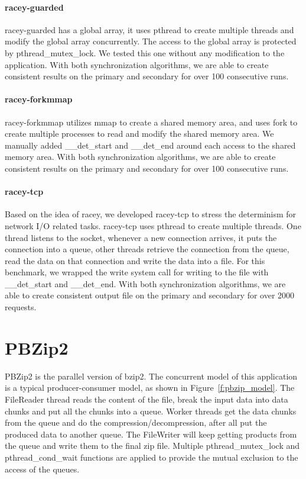 \paragraph{racey-guarded} racey-guarded has a global array, it uses pthread to create multiple threads and modify the global array concurrently. The access to the global array is protected by pthread\_mutex\_lock. We tested this one without any modification to the application. With both synchronization algorithms, we are able to create consistent results on the primary and secondary for over 100 consecutive runs.

\paragraph{racey-forkmmap} racey-forkmmap utilizes mmap to create a shared memory area, and uses fork to create multiple processes to read and modify the shared memory area. We manually added \_\_det\_start and \_\_det\_end around each access to the shared memory area. With both synchronization algorithms, we are able to create consistent results on the primary and secondary for over 100 consecutive runs.

\paragraph{racey-tcp} Based on the idea of racey, we developed racey-tcp to stress the determinism for network I/O related tasks. racey-tcp uses pthread to create multiple threads. One thread listens to the socket, whenever a new connection arrives, it puts the connection into a queue, other threads retrieve the connection from the queue, read the data on that connection and write the data into a file. For this benchmark, we wrapped the write system call for writing to the file with \_\_det\_start and \_\_det\_end. With both synchronization algorithms, we are able to create consistent output file on the primary and secondary for over 2000 requests.

\section{PBZip2}
PBZip2 is the parallel version of bzip2. The concurrent model of this application is a typical producer-consumer model, as shown in Figure~\ref{f:pbzip_model}. The FileReader thread reads the content of the file, break the input data into data chunks and put all the chunks into a queue. Worker threads get the data chunks from the queue and do the compression/decompression, after all put the produced data to another queue. The FileWriter will keep getting products from the queue and write them to the final zip file. Multiple pthread\_mutex\_lock and pthread\_cond\_wait functions are applied to provide the mutual exclusion to the access of the queues.

